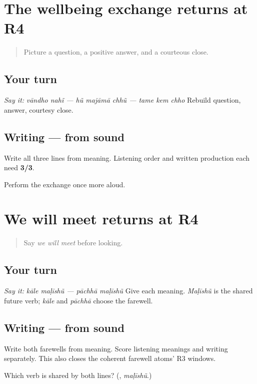 \section[Practice]{The wellbeing exchange returns at R4}

\label{lesson:GU-R18-wellbeing-r4}



\begin{quote}
Picture a question, a positive answer, and a courteous close.
\end{quote}

\subsection*{Your turn}
\emph{Say it:} \emph{vāndho nahĩ — hũ majāmā chhũ — tame kem chho} Rebuild question, answer, courtesy close.

\subsection*{Writing — from sound}
Write all three lines from meaning. Listening order and written production each need \textbf{3/3}.

\begin{tcolorbox}[breakable,colback=teal!4,colframe=teal!35!black,title={Before you move on}]
Perform the exchange once more aloud.
\end{tcolorbox}
\section[Practice]{We will meet returns at R4}

\label{lesson:GU-R18-farewell-r4}



\begin{quote}
Say \emph{we will meet} before looking.
\end{quote}

\subsection*{Your turn}
\emph{Say it:} \emph{kāle maḷīshũ — pāchhā maḷīshũ} Give each meaning. \emph{Maḷīshũ} is the shared future verb; \emph{kāle} and \emph{pāchhā} choose the farewell.

\subsection*{Writing — from sound}
Write both farewells from meaning. Score listening meanings and writing separately. This also closes the coherent farewell atoms' R3 windows.

\begin{tcolorbox}[breakable,colback=teal!4,colframe=teal!35!black,title={Before you move on}]
Which verb is shared by both lines? (\textbf{}, \emph{maḷīshũ}.)
\end{tcolorbox}
